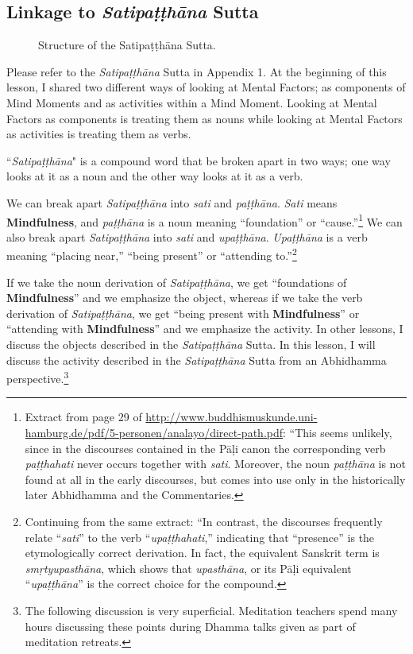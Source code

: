 \subsection*{Linkage to \textit{Satipaṭṭhāna} Sutta}

\begin{figure}[H]
\centering

\caption{Structure of the Satipaṭṭhāna Sutta.}
\label{fig:Sati}
\end{figure}

Please refer to the \textit{Satipaṭṭhāna} Sutta in Appendix 1. At the beginning of this lesson, I shared two different ways of looking at Mental Factors; as components of Mind Moments and as activities within a Mind Moment. Looking at Mental Factors as components is treating them as nouns while looking at Mental Factors as activities is treating them as verbs.

``\textit{Satipaṭṭhāna}" is a compound word that be broken apart in two ways; one way looks at it as a noun and the other way looks at it as a verb.

\pagebreak

We can break apart \textit{Satipaṭṭhāna} into \textit{sati} and \textit{paṭṭhāna}. \textit{Sati} means \textbf{Mindfulness}, and \textit{paṭṭhāna} is a noun meaning “foundation” or “cause.”\footnote{Extract from page 29 of \url{http://www.buddhismuskunde.uni-hamburg.de/pdf/5-personen/analayo/direct-path.pdf}: “This seems unlikely, since in the discourses contained in the Pāḷi canon the corresponding verb \textit{paṭṭhahati} never occurs together with \textit{sati}. Moreover, the noun \textit{paṭṭhāna} is not found at all in the early discourses, but comes into use only in the historically later Abhidhamma and the Commentaries.} We can also break apart \textit{Satipaṭṭhāna} into \textit{sati} and \textit{upaṭṭhāna}. \textit{Upaṭṭhāna} is a verb meaning “placing near,” “being present” or “attending to.”\footnote{Continuing from the same extract: “In contrast, the discourses frequently relate “\textit{sati}” to the verb “\textit{upaṭṭhahati},” indicating that “presence” is the etymologically correct derivation. In fact, the equivalent Sanskrit term is \textit{smṛtyupasthāna}, which shows that \textit{upasthāna}, or its Pāḷi equivalent “\textit{upaṭṭhāna}” is the correct choice for the compound.}

If we take the noun derivation of \textit{Satipaṭṭhāna}, we get “foundations of \textbf{Mindfulness}” and we emphasize the object, whereas if we take the verb derivation of \textit{Satipaṭṭhāna}, we get “being present with \textbf{Mindfulness}” or “attending with \textbf{Mindfulness}” and we emphasize the activity. In other lessons, I discuss the objects described in the \textit{Satipaṭṭhāna} Sutta. In this lesson, I will discuss the activity described in the \textit{Satipaṭṭhāna} Sutta from an Abhidhamma perspective.\footnote{The following discussion is very superficial. Meditation teachers spend many hours discussing these points during Dhamma talks given as part of meditation retreats.}

